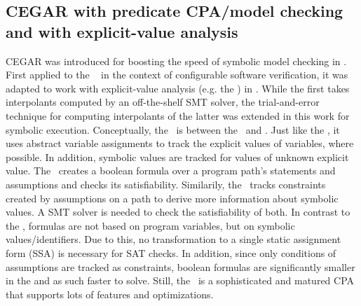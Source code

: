 \subsection*{CEGAR with predicate CPA/model checking and with explicit-value analysis}
CEGAR was introduced for boosting the speed of symbolic model checking in \cite{Clarke2003}.
First applied to the \predicateCPA\ \cite{Beyer2012} in the context of configurable software verification,
it was adapted to work with explicit-value analysis (e.g. the ) in \cite{Beyer2013}.
While the first takes interpolants computed by an off-the-shelf SMT solver, the trial-and-error technique
for computing interpolants of the latter was extended in this work for symbolic execution.
Conceptually, the \symbolicExecutionCPA\ is between the \ and \predicateCPA.
Just like the , it uses abstract variable assignments to track the explicit values of variables, where possible.
In addition, symbolic values are tracked for values of unknown explicit value.
The \predicateCPA\ creates a boolean formula over a program path's statements and assumptions and checks its satisfiability.
Similarily, the \symbolicExecutionCPA\ tracks constraints created by assumptions on a path to derive more information about symbolic values.
A SMT solver is needed to check the satisfiability of both.
In contrast to the \predicateCPA, formulas are not based on program variables, but on symbolic values/identifiers.
Due to this, no transformation to a single static assignment form (SSA) is necessary for SAT checks.
In addition, since only conditions of assumptions are tracked as constraints, boolean formulas are significantly smaller in the \symbolicExecutionCPA
and as such faster to solve.
Still, the \predicateCPA\ is a sophisticated and matured CPA that supports lots of features and optimizations.
